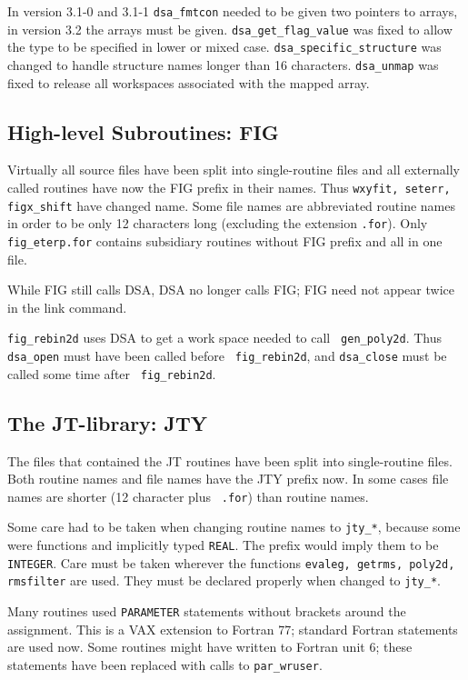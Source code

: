 In version 3.1-0 and 3.1-1 {\tt dsa\_fmtcon} needed to be given two pointers
to arrays, in version 3.2 the arrays must be given.
{\tt dsa\_get\_flag\_value} was fixed to allow the type to be specified in
lower or mixed case.  {\tt dsa\_specific\_structure} was changed to handle
structure names longer than 16 characters.  {\tt dsa\_unmap} was fixed to
release all workspaces associated with the mapped array.


\subsection{High-level Subroutines: FIG}

Virtually all source files have been split into single-routine files and
all externally called routines have now the FIG prefix in their names.
Thus {\tt wxyfit, seterr, figx\_shift} have changed name.  Some file names are
abbreviated routine names in order to be only 12 characters long
(excluding the extension {\tt .for}).  Only {\tt fig\_eterp.for}
contains subsidiary routines without FIG prefix and all in one file.

While FIG still calls DSA, DSA no longer calls FIG; FIG need not appear
twice in the link command.

{\tt fig\_rebin2d} uses DSA to get a work space needed to call {\tt
gen\_poly2d}.  Thus {\tt dsa\_open} must have been called before {\tt
fig\_rebin2d}, and {\tt dsa\_close} must be called some time after {\tt
fig\_rebin2d}.


\subsection{The JT-library: JTY}

The files that contained the JT routines have been split into
single-routine files. Both routine names and file names have the JTY
prefix now. In some cases file names are shorter (12 character plus {\tt
.for}) than routine names.

Some care had to be taken when changing routine names to {\tt jty\_*}, because
some were functions and implicitly typed {\tt REAL}. The prefix would
imply them to be {\tt INTEGER}. Care must be taken wherever the
functions {\tt evaleg, getrms, poly2d, rmsfilter} are used. They must be
declared properly when changed to {\tt jty\_*}.

Many routines used {\tt PARAMETER} statements without brackets around
the assignment.  This is a VAX extension to Fortran 77; standard Fortran
statements are used now.  Some routines might have written to Fortran
unit 6; these statements have been replaced with calls to {\tt par\_wruser}.


